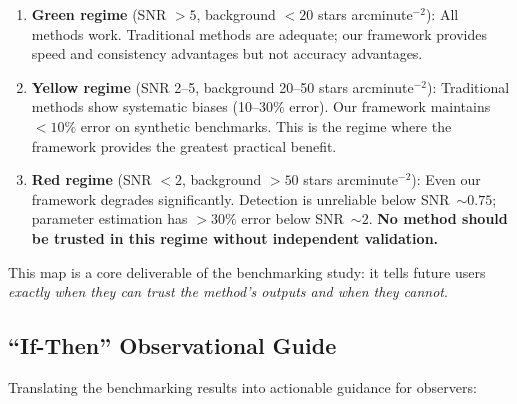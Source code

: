 \documentclass[preprint2]{aastex631}
\begin{document}
\begin{enumerate}
    \item \textbf{Green regime} (SNR $>5$, background $<20$ stars arcminute$^{-2}$): All methods work. Traditional methods are adequate; our framework provides speed and consistency advantages but not accuracy advantages.
    \item \textbf{Yellow regime} (SNR 2--5, background 20--50 stars arcminute$^{-2}$): Traditional methods show systematic biases (10--30\% error). Our framework maintains $<10\%$ error on synthetic benchmarks. This is the regime where the framework provides the greatest practical benefit.
    \item \textbf{Red regime} (SNR $<2$, background $>50$ stars arcminute$^{-2}$): Even our framework degrades significantly. Detection is unreliable below SNR~$\sim 0.75$; parameter estimation has $>30\%$ error below SNR~$\sim 2$. \textbf{No method should be trusted in this regime without independent validation.}
\end{enumerate}

This map is a core deliverable of the benchmarking study: it tells future users \textit{exactly when they can trust the method's outputs and when they cannot}.

\subsection{``If-Then'' Observational Guide}\label{sec:ifthen}

Translating the benchmarking results into actionable guidance for observers:
\end{document}
